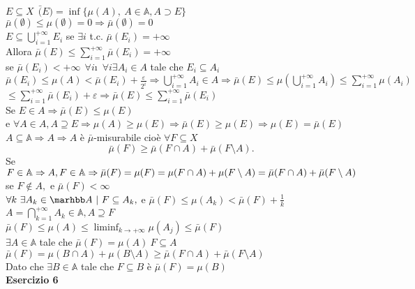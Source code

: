 \documentclass[12px]{article}
\begin{document}
$E\subseteq X \ \ \bar (E) = \inf\{\mu(A), \ A\in \mathbb A, A\supset E\}$\\
$\bar\mu(\emptyset)\leq \mu(\emptyset) = 0 \Rightarrow \bar\mu(\emptyset) = 0$ \\
$E\subseteq \bigcup^{+\infty}_{i =1}E_i$ se $\exists i $ t.c.  $\bar\mu(E_i) = +\infty$\\
Allora  $\bar\mu(E) \leq \sum^{+\infty}_{i = 1}\bar\mu(E_i) = +\infty$\\
se $\bar\mu(E_i) < +\infty \ \ \forall i$\i\
$\forall i \exists A_i\in A$ tale che  $E_i\subseteq A_i$\ \ \  $\bar\mu(E_i)\leq \mu(A)<\bar\mu (E_i) + \frac{\varepsilon}{2^i} \Rightarrow \bigcup^{+\infty}_{i=1}A_i\in A \Rightarrow \bar\mu(E)\leq \mu ( \bigcup^{+\infty}_{i=1}A_i)\leq \sum^{+\infty}_{i = 1}\mu(A_i)$ \\
$\leq \sum^{+\infty}_{i = 1}\bar\mu(E_i) + \varepsilon \Rightarrow \bar\mu(E) \leq \sum^{+\infty}_{i = 1}\bar\mu (E_i)$ \\
Se $E\in A \Rightarrow \bar\mu (E) \leq \mu(E)$ \\
e $\forall A\in A, A\supseteq E \Rightarrow \mu(A) \geq \mu(E) \Rightarrow \bar\mu(E)\geq \mu(E) \Rightarrow \mu(E) = \bar\mu(E)$ \\
$A\subseteq \mathbb A \Rightarrow  A  \Rightarrow A $  è $\bar\mu$-misurabile cioè $\forall F\subseteq X$ 
\[
\bar\mu(F) \geq \bar\mu(F\cap A) + \bar\mu(F\setminus A)
.\] 
Se $F\in \mathbb A \Rightarrow A,F\in\mathbb A \Rightarrow \bar\mu(F) = \mu(F) \\= \mu(F\cap A) + \mu(F\setminus A) = \bar\mu (F\cap A) +\bar \mu(F\setminus A)$\\
se $F\not\in A, $ e  $\bar\mu(F) <\infty$\\
 $\forall k \ \exists A_k\in \marhbb A\ | \ F\subseteq A_k, $ e  $\bar\mu(F)\leq \mu(A_k) < \bar\mu(F) + \frac 1k$\\
 $A= \bigcap^{+\infty}_{k=1} A_k\in \mathbb A, A\supseteq F$\\
 $\bar\mu(F)\leq \mu(A)\leq \liminf_{k \rightarrow +\infty} \mu(A_j)\leq \bar\mu(F)$\\
 $\exists A\in\mathbb A$ tale che $\bar\mu (F) = \mu(A) \ F\subseteq A$\\
  $\bar\mu(F) = \mu(B\cap A) + \mu(B\setminus A)\geq \bar\mu(F\cap A) + \bar\mu(F\setminus A)$\\
  Dato che  $\exists B\in \mathbb A$ tale che $F\subseteq B$ è $\bar\mu(F) = \mu(B)$ \\[10px]
\textbf{Esercizio 6}\\
\end{document}
